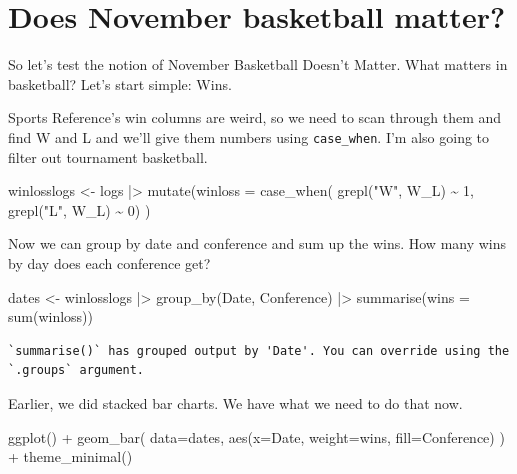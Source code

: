 \documentclass[
  letterpaper,
  DIV=11,
  numbers=noendperiod]{scrreprt}
\newenvironment{Shaded}{\begin{snugshade}}{\end{snugshade}}
\newcommand{\AttributeTok}[1]{\textcolor[rgb]{0.40,0.45,0.13}{#1}}
\newcommand{\DecValTok}[1]{\textcolor[rgb]{0.68,0.00,0.00}{#1}}
\newcommand{\FunctionTok}[1]{\textcolor[rgb]{0.28,0.35,0.67}{#1}}
\newcommand{\NormalTok}[1]{\textcolor[rgb]{0.00,0.23,0.31}{#1}}
\newcommand{\OtherTok}[1]{\textcolor[rgb]{0.00,0.23,0.31}{#1}}
\newcommand{\SpecialCharTok}[1]{\textcolor[rgb]{0.37,0.37,0.37}{#1}}
\newcommand{\StringTok}[1]{\textcolor[rgb]{0.13,0.47,0.30}{#1}}
\begin{document}
\hypertarget{does-november-basketball-matter}{%
\section{Does November basketball
matter?}\label{does-november-basketball-matter}}

So let's test the notion of November Basketball Doesn't Matter. What
matters in basketball? Let's start simple: Wins.

Sports Reference's win columns are weird, so we need to scan through
them and find W and L and we'll give them numbers using
\texttt{case\_when}. I'm also going to filter out tournament basketball.

\begin{Shaded}
\begin{Highlighting}[]
\NormalTok{winlosslogs }\OtherTok{\textless{}{-}}\NormalTok{ logs }\SpecialCharTok{|\textgreater{}} 
  \FunctionTok{mutate}\NormalTok{(}\AttributeTok{winloss =} \FunctionTok{case\_when}\NormalTok{(}
    \FunctionTok{grepl}\NormalTok{(}\StringTok{"W"}\NormalTok{, W\_L) }\SpecialCharTok{\textasciitilde{}} \DecValTok{1}\NormalTok{, }
    \FunctionTok{grepl}\NormalTok{(}\StringTok{"L"}\NormalTok{, W\_L) }\SpecialCharTok{\textasciitilde{}} \DecValTok{0}\NormalTok{)}
\NormalTok{) }
\end{Highlighting}
\end{Shaded}

Now we can group by date and conference and sum up the wins. How many
wins by day does each conference get?

\begin{Shaded}
\begin{Highlighting}[]
\NormalTok{dates }\OtherTok{\textless{}{-}}\NormalTok{ winlosslogs }\SpecialCharTok{|\textgreater{}} 
  \FunctionTok{group\_by}\NormalTok{(Date, Conference) }\SpecialCharTok{|\textgreater{}} 
  \FunctionTok{summarise}\NormalTok{(}\AttributeTok{wins =} \FunctionTok{sum}\NormalTok{(winloss))}
\end{Highlighting}
\end{Shaded}

\begin{verbatim}
`summarise()` has grouped output by 'Date'. You can override using the
`.groups` argument.
\end{verbatim}

Earlier, we did stacked bar charts. We have what we need to do that now.

\begin{Shaded}
\begin{Highlighting}[]
\FunctionTok{ggplot}\NormalTok{() }\SpecialCharTok{+} 
  \FunctionTok{geom\_bar}\NormalTok{(}
    \AttributeTok{data=}\NormalTok{dates, }
    \FunctionTok{aes}\NormalTok{(}\AttributeTok{x=}\NormalTok{Date, }\AttributeTok{weight=}\NormalTok{wins, }\AttributeTok{fill=}\NormalTok{Conference)}
\NormalTok{    ) }\SpecialCharTok{+} 
  \FunctionTok{theme\_minimal}\NormalTok{()}
\end{Highlighting}
\end{Shaded}
\end{document}
